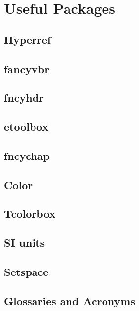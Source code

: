 \documentclass{report}
\begin{document}
\tableofcontents


\chapter{Useful Packages}
\section{Hyperref} 

\section{fancyvbr}

\section{fncyhdr}

\section{etoolbox}

\section{fncychap}

\section{Color}

\section{Tcolorbox}

\section{SI units}

\section{Setspace}

\section{Glossaries and Acronyms}
\end{document}
